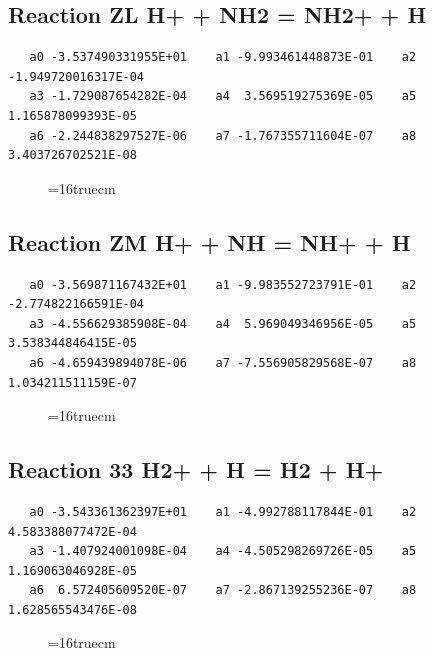 \documentclass[12pt]{article}
\begin{document}
\subsection{
Reaction ZL H+ + NH2 = NH2+ + H}
\begin{small}\begin{verbatim}
   a0 -3.537490331955E+01    a1 -9.993461448873E-01    a2 -1.949720016317E-04
   a3 -1.729087654282E-04    a4  3.569519275369E-05    a5  1.165878099393E-05
   a6 -2.244838297527E-06    a7 -1.767355711604E-07    a8  3.403726702521E-08
   \end{verbatim}\end{small}
\begin{figure}[h!] \label{n2rates}
\epsfxsize=16truecm
\end{figure}
\newpage

\subsection{
Reaction ZM 	H+ + NH = NH+ + H}
\begin{small}\begin{verbatim}
   a0 -3.569871167432E+01    a1 -9.983552723791E-01    a2 -2.774822166591E-04
   a3 -4.556629385908E-04    a4  5.969049346956E-05    a5  3.538344846415E-05
   a6 -4.659439894078E-06    a7 -7.556905829568E-07    a8  1.034211511159E-07
   \end{verbatim}\end{small}
\begin{figure}[h!] \label{n2rates}
\epsfxsize=16truecm
\end{figure}
\newpage

\subsection{
Reaction 33 H2+ + H = H2 + H+}
\begin{small}\begin{verbatim}
   a0 -3.543361362397E+01    a1 -4.992788117844E-01    a2  4.583388077472E-04
   a3 -1.407924001098E-04    a4 -4.505298269726E-05    a5  1.169063046928E-05
   a6  6.572405609520E-07    a7 -2.867139255236E-07    a8  1.628565543476E-08
   \end{verbatim}\end{small}
\begin{figure}[h!] \label{n2rates}
\epsfxsize=16truecm
\end{figure}
\newpage
\end{document}
